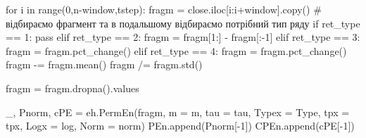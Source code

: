 \documentclass[
  letterpaper,
]{report}
\newenvironment{Shaded}{\begin{snugshade}}{\end{snugshade}}
\newcommand{\BuiltInTok}[1]{\textcolor[rgb]{0.00,0.23,0.31}{#1}}
\newcommand{\CommentTok}[1]{\textcolor[rgb]{0.37,0.37,0.37}{#1}}
\newcommand{\ControlFlowTok}[1]{\textcolor[rgb]{0.00,0.23,0.31}{#1}}
\newcommand{\DecValTok}[1]{\textcolor[rgb]{0.68,0.00,0.00}{#1}}
\newcommand{\KeywordTok}[1]{\textcolor[rgb]{0.00,0.23,0.31}{#1}}
\newcommand{\NormalTok}[1]{\textcolor[rgb]{0.00,0.23,0.31}{#1}}
\newcommand{\OperatorTok}[1]{\textcolor[rgb]{0.37,0.37,0.37}{#1}}
\begin{document}
\begin{Shaded}
\begin{Highlighting}[]
\ControlFlowTok{for}\NormalTok{ i }\KeywordTok{in} \BuiltInTok{range}\NormalTok{(}\DecValTok{0}\NormalTok{,n}\OperatorTok{{-}}\NormalTok{window,tstep):}
\NormalTok{    fragm }\OperatorTok{=}\NormalTok{ close.iloc[i:i}\OperatorTok{+}\NormalTok{window].copy() }\CommentTok{\# відбираємо фрагмент та в подальшому відбираємо потрібний тип ряду}
    \ControlFlowTok{if}\NormalTok{ ret\_type }\OperatorTok{==} \DecValTok{1}\NormalTok{:}
        \ControlFlowTok{pass}
    \ControlFlowTok{elif}\NormalTok{ ret\_type }\OperatorTok{==} \DecValTok{2}\NormalTok{:}
\NormalTok{        fragm }\OperatorTok{=}\NormalTok{ fragm[}\DecValTok{1}\NormalTok{:] }\OperatorTok{{-}}\NormalTok{ fragm[:}\OperatorTok{{-}}\DecValTok{1}\NormalTok{]}
    \ControlFlowTok{elif}\NormalTok{ ret\_type }\OperatorTok{==} \DecValTok{3}\NormalTok{:}
\NormalTok{        fragm }\OperatorTok{=}\NormalTok{ fragm.pct\_change()}
    \ControlFlowTok{elif}\NormalTok{ ret\_type }\OperatorTok{==} \DecValTok{4}\NormalTok{:}
\NormalTok{        fragm }\OperatorTok{=}\NormalTok{ fragm.pct\_change()}
\NormalTok{        fragm }\OperatorTok{{-}=}\NormalTok{ fragm.mean()}
\NormalTok{        fragm }\OperatorTok{/=}\NormalTok{ fragm.std()}
        
\NormalTok{    fragm }\OperatorTok{=}\NormalTok{ fragm.dropna().values}
    
\NormalTok{    \_, Pnorm, cPE }\OperatorTok{=}\NormalTok{ eh.PermEn(fragm, m }\OperatorTok{=}\NormalTok{ m, tau }\OperatorTok{=}\NormalTok{ tau, Typex }\OperatorTok{=}\NormalTok{ Type, tpx }\OperatorTok{=}\NormalTok{ tpx, Logx }\OperatorTok{=}\NormalTok{ log, Norm }\OperatorTok{=}\NormalTok{ norm)}
\NormalTok{    PEn.append(Pnorm[}\OperatorTok{{-}}\DecValTok{1}\NormalTok{])}
\NormalTok{    CPEn.append(cPE[}\OperatorTok{{-}}\DecValTok{1}\NormalTok{])}
\end{Highlighting}
\end{Shaded}
\end{document}
